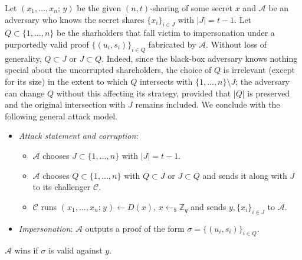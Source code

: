 \documentclass{iacrtrans}
\begin{document}
Let $(x_1, \dots, x_n;\hspace{2pt} y)$
be the given $(n, t)$-sharing of some secret $x$
and $\mathcal{A}$ be an adversary who knows
the secret shares
$\{x_i\}_{i \in J}$ with $|J| = t-1$.
Let $Q \subset \{1, \dots, n\}$ be the
sharholders that fall victim to impersonation
under a purportedly valid proof $\{(u_i, s_i)\}_{i \in Q}$
fabricated by $\mathcal{A}$.
Without loss of generality,
$Q \subset J$ or $J \subset Q$.
Indeed, since the black-box adversary knows nothing
special about the uncorrupted shareholders,
the choice of $Q$ is irrelevant
(except for its size) in the extent to which
$Q$ intersects with $\{1, \dots, n\} \setminus J$;
the adversary can change $Q$
without this affecting its strategy,
provided that $|Q|$ is preserved and
the original intersection with $J$ remains included.
We conclude with the following general attack model.
\begin{itemize}[label=$\bullet$,leftmargin=20pt,rightmargin=0pt]
	\vspace{4pt}
	\item
		\textit{Attack statement and corruption}:
			\begin{itemize}[
				label=$\circ$,leftmargin=17pt,rightmargin=21pt
			]
			\vspace{3pt}
			\item $\mathcal{A}$ chooses $J \subset \{1, \dots, n\}$
				with $|J| = t-1$.
				\vspace{3pt}
			\item $\mathcal{A}$ chooses $Q \subset \{1, \dots, n\}$
				with $Q \subset J$  or $J \subset Q$ and
				sends it along with $J$ to its challenger
				$\mathcal{C}$.
				\vspace{3pt}
			\item $\mathcal{C}$ runs
				$(\hspace{1pt}x_1, \dots, x_n;\hspace{1pt} y\hspace{1pt})
				\leftarrow D(x),\hspace{2pt} x \leftarrow_\$ \mathbb{Z}_q$
				and sends $y, \{x_i\}_{i \in J}$
				to $\mathcal{A}$.
			\vspace{3pt}
			\end{itemize}
	\item \textit{Impersonation}:
		$\mathcal{A}$ outputs a proof of the form
		$\sigma = \{(u_i, s_i)\}_{i \in Q}$.
\vspace{5pt}
\end{itemize}
\hspace*{5pt}%
\begin{minipage}{\dimexpr\textwidth-\parindent\relax}%
\hspace{0pt}
$\mathcal{A}$ wins if $\sigma$ is valid against $y$.
\vspace{5pt}
\end{minipage}%
\end{document}
